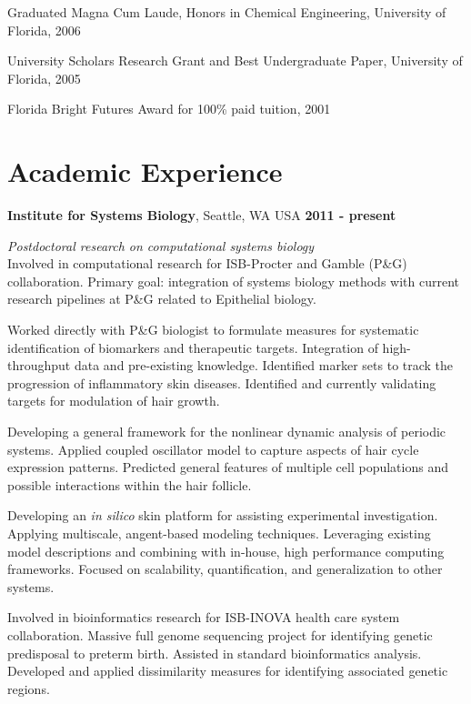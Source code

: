 \documentclass[margin,line]{res}
\begin{document}
\begin{resume}
\vspace*{-2.5mm}
Graduated Magna Cum Laude, Honors in Chemical Engineering, University of Florida, 2006

\vspace*{-2.5mm}
University Scholars Research Grant and Best Undergraduate Paper, University of Florida, 2005

\vspace*{-2.5mm}
Florida Bright Futures Award for 100\% paid tuition, 2001



\section{\sc Academic Experience}
{\bf Institute for Systems Biology}, Seattle, WA USA \hfill {\bf 2011 - present}

{\em Postdoctoral research on computational systems  biology}\\
Involved in computational research for ISB-Procter and Gamble (P\&G) collaboration.  
Primary goal: integration of systems biology methods with current research pipelines at P\&G
related to Epithelial biology.

Worked directly with P\&G biologist to formulate measures 
for systematic identification of biomarkers and therapeutic targets.
Integration of high-throughput data and pre-existing knowledge.
Identified marker sets to track the progression of inflammatory skin diseases.
Identified and currently validating targets for modulation of hair growth.

Developing a general framework for the nonlinear dynamic analysis of periodic systems. 
Applied coupled oscillator model to capture aspects of hair cycle expression patterns.
Predicted general features of multiple cell populations and possible interactions 
within the hair follicle.

Developing an {\em in silico} skin platform for assisting experimental investigation.
Applying multiscale, angent-based modeling techniques.
Leveraging existing model descriptions and combining with in-house, high performance computing frameworks.
Focused on scalability, quantification, and generalization to other systems.  

Involved in bioinformatics research for ISB-INOVA health care system collaboration.
Massive full genome sequencing project for identifying genetic predisposal to preterm birth.
Assisted in standard bioinformatics analysis.
Developed and applied dissimilarity measures for identifying associated genetic regions.



\end{resume}
\end{document}
